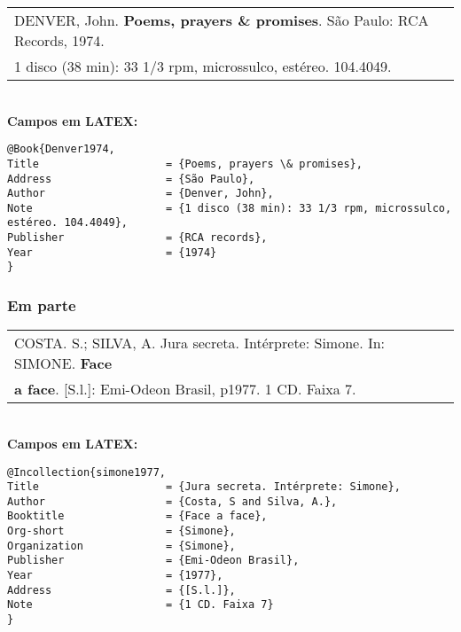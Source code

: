 \begin{tabular}{|l|c|} \hline
	DENVER, John. \textbf{Poems, prayers \& promises}. São Paulo: RCA Records, 1974. \\
	1 disco (38 min): 33 1/3 rpm, microssulco, estéreo. 104.4049.                    
	                                                                                  \\\hline
\end{tabular} \\
	
\textbf{Campos em LATEX:} 
	
\begingroup
\fontsize{10pt}{12pt}\selectfont
\begin{verbatim}
@Book{Denver1974,
Title                    = {Poems, prayers \& promises},
Address                  = {São Paulo},
Author                   = {Denver, John},
Note                     = {1 disco (38 min): 33 1/3 rpm, microssulco, 
estéreo. 104.4049},
Publisher                = {RCA records},
Year                     = {1974}
}
\end{verbatim}
\endgroup
\subsubsection{Em parte}
	
\begin{tabular}{|l|c|} \hline
	COSTA. S.; SILVA, A. Jura secreta. Intérprete: Simone. In: SIMONE. \textbf{Face} \\ \textbf{a face}. [S.l.]: Emi-Odeon Brasil, p1977. 1 CD. Faixa 7. 
	                                                                                  \\\hline
\end{tabular} \\
	
\textbf{Campos em LATEX:} 
	
\begingroup
\fontsize{10pt}{12pt}\selectfont
\begin{verbatim}
@Incollection{simone1977,
Title                    = {Jura secreta. Intérprete: Simone},
Author                   = {Costa, S and Silva, A.},
Booktitle                = {Face a face},
Org-short                = {Simone},
Organization             = {Simone},
Publisher                = {Emi-Odeon Brasil},
Year                     = {1977},
Address                  = {[S.l.]},
Note                     = {1 CD. Faixa 7}
}
\end{verbatim}
\endgroup
	
